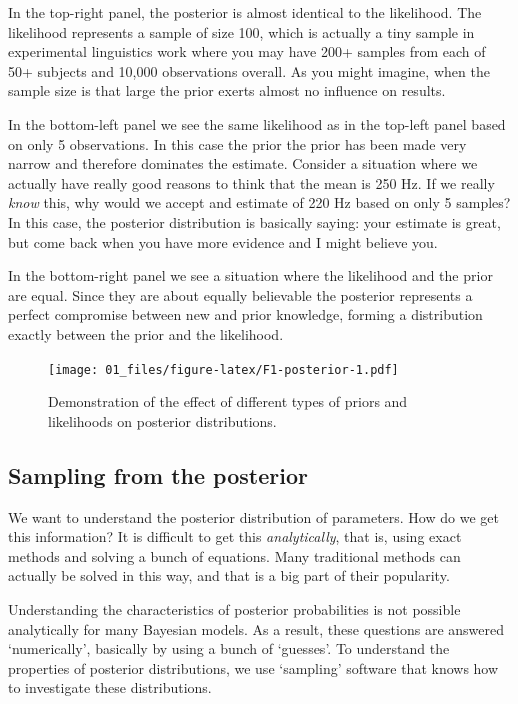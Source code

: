 \documentclass[
]{book}
\begin{document}
In the top-right panel, the posterior is almost identical to the likelihood. The likelihood represents a sample of size 100, which is actually a tiny sample in experimental linguistics work where you may have 200+ samples from each of 50+ subjects and 10,000 observations overall. As you might imagine, when the sample size is that large the prior exerts almost no influence on results.

In the bottom-left panel we see the same likelihood as in the top-left panel based on only 5 observations. In this case the prior the prior has been made very narrow and therefore dominates the estimate. Consider a situation where we actually have really good reasons to think that the mean is 250 Hz. If we really \emph{know} this, why would we accept and estimate of 220 Hz based on only 5 samples? In this case, the posterior distribution is basically saying: your estimate is great, but come back when you have more evidence and I might believe you.

In the bottom-right panel we see a situation where the likelihood and the prior are equal. Since they are about equally believable the posterior represents a perfect compromise between new and prior knowledge, forming a distribution exactly between the prior and the likelihood.

\begin{figure}
\centering
\texttt{[image: 01\_files/figure-latex/F1-posterior-1.pdf]}
\caption{\label{fig:F1-posterior}Demonstration of the effect of different types of priors and likelihoods on posterior distributions.}
\end{figure}

\hypertarget{sampling-from-the-posterior}{%
\subsection{Sampling from the posterior}\label{sampling-from-the-posterior}}

We want to understand the posterior distribution of parameters. How do we get this information? It is difficult to get this \emph{analytically}, that is, using exact methods and solving a bunch of equations. Many traditional methods can actually be solved in this way, and that is a big part of their popularity.

Understanding the characteristics of posterior probabilities is not possible analytically for many Bayesian models. As a result, these questions are answered `numerically', basically by using a bunch of `guesses'. To understand the properties of posterior distributions, we use `sampling' software that knows how to investigate these distributions.
\end{document}
